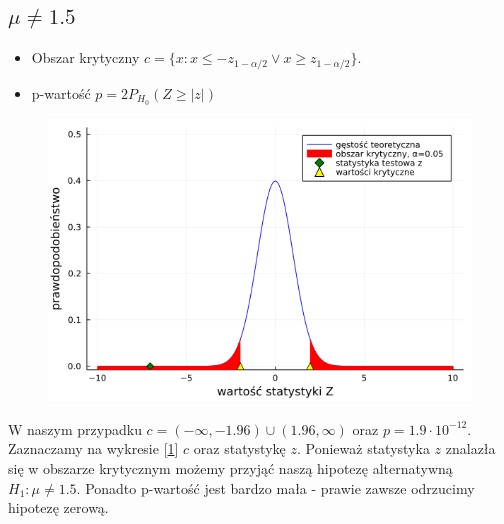 \documentclass{article}
\theoremstyle{break}
\begin{document}
\subsection*{$\mu \ne 1.5$}
	\begin{itemize}
		\item Obszar krytyczny $c=\{x: x\leq -z_{1-\alpha/2} \lor x\geq z_{1-\alpha/2}\}$.
		\item p-wartość $p=2P_{H_0}(Z\geq|z|)$
	\end{itemize}
\begin{figure}[H]
	\begin{center}
		\includegraphics[scale=0.5]{Z1.1.png}
		\caption{}
		\label{fig:1}
	\end{center}
\end{figure}
	W naszym przypadku $c=(-\infty,-1.96)\cup (1.96,\infty)$ oraz $p=1.9\cdot 10^{-12}$.\\
	Zaznaczamy na wykresie [\ref{fig:1}]  $c$ oraz statystykę $z$. Ponieważ statystyka $z$ znalazła się w obszarze krytycznym możemy przyjąć naszą hipotezę alternatywną $H_1: \mu \ne 1.5$. Ponadto p-wartość jest bardzo mała - prawie zawsze odrzucimy hipotezę zerową.
\end{document}
